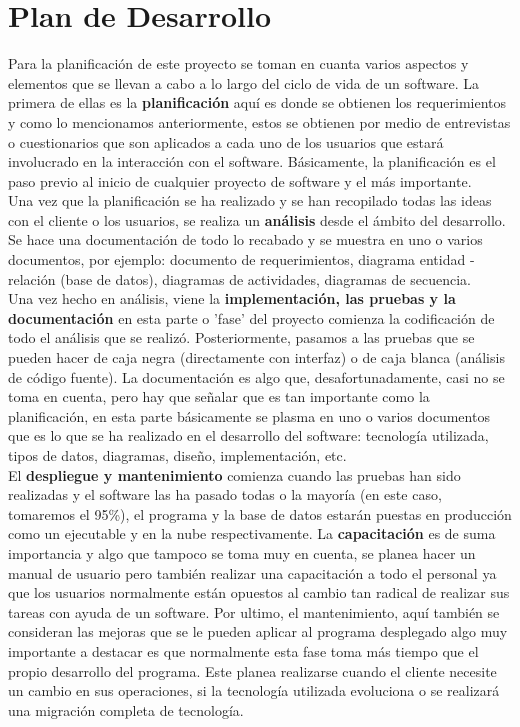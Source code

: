 \section{Plan de Desarrollo}
Para la planificación de este proyecto se toman en cuanta varios aspectos y elementos que se llevan a cabo a lo largo del ciclo de vida de un software. La primera de ellas es la \textbf{planificación} aquí es donde se obtienen los requerimientos y como lo mencionamos anteriormente, estos se obtienen por medio de entrevistas o cuestionarios que son aplicados a cada uno de los usuarios que estará involucrado en la interacción con el software. Básicamente, la planificación es el paso previo al inicio de cualquier proyecto de software y el más importante.
\\ 
Una vez que la planificación se ha realizado y se han recopilado todas las ideas con el cliente o los usuarios, se realiza un \textbf{análisis} desde el ámbito del desarrollo. Se hace una documentación de todo lo recabado y se muestra en uno o varios documentos, por ejemplo: documento de requerimientos, diagrama entidad - relación (base de datos), diagramas de actividades, diagramas de secuencia. 
\\ 
Una vez hecho en análisis, viene la \textbf{implementación, las pruebas y la documentación} en esta parte o 'fase' del proyecto comienza la codificación de todo el análisis que se realizó. Posteriormente, pasamos a las pruebas que se pueden hacer de caja negra (directamente con interfaz) o de caja blanca (análisis de código fuente). La documentación es algo que, desafortunadamente, casi no se toma en cuenta, pero hay que señalar que es tan importante como la planificación, en esta parte básicamente se plasma en uno o varios documentos que es lo que se ha realizado en el desarrollo del software: tecnología utilizada, tipos de datos, diagramas, diseño, implementación, etc.
\\
El \textbf{despliegue y mantenimiento } comienza cuando las pruebas han sido realizadas y el software las ha pasado todas o la mayoría (en este caso, tomaremos el 95\%), el programa y la base de datos estarán puestas en producción como un ejecutable y en la nube respectivamente. La \textbf{capacitación} es de suma importancia y algo que tampoco se toma muy en cuenta, se planea hacer un manual de usuario pero también realizar una capacitación a todo el personal ya que los usuarios normalmente están opuestos al cambio tan radical de realizar sus tareas con ayuda de un software. Por ultimo, el mantenimiento, aquí también se consideran las mejoras que se le pueden aplicar al programa desplegado algo muy importante a destacar es que normalmente esta fase toma más tiempo que el propio desarrollo del programa. Este planea realizarse cuando el cliente necesite un cambio en sus operaciones, si la tecnología utilizada evoluciona o se realizará una migración completa de tecnología. 

